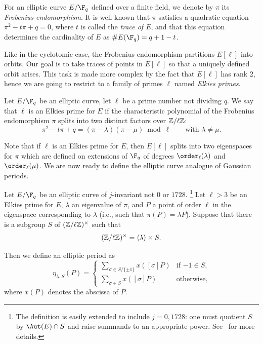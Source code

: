 For an elliptic curve $E/\F_q$ defined over a finite field, we denote
by $\pi$ its \emph{Frobenius endomorphism}. It is well known that
$\pi$ satisfies a quadratic equation $\pi^2-t\pi+q=0$, where $t$ is
called the \emph{trace of $E$}, and that this equation determines the
cardinality of $E$ as $\#E(\F_q)=q+1-t$.

Like in the cyclotomic case, the Frobenius endomorphism partitions
$E[\ell]$ into orbits. Our goal is to take traces of points in
$E[\ell]$ so that a uniquely defined orbit arises. This task is made
more complex by the fact that $E[\ell]$ has rank 2, hence we are going
to restrict to a family of primes $\ell$ named \emph{Elkies primes}.

\begin{definition}
  Let $E/\F_q$ be an elliptic curve, let $\ell$ be a prime number not
  dividing $q$.  We say that $\ell$ is an Elkies prime for $E$ if the
  characteristic polynomial of the Frobenius endomorphism $\pi$ splits
  into two distinct factors over $\mathbb{Z}/\ell\mathbb{Z}$:
\begin{equation}
\pi^2-t\pi+q=(\pi-\lambda)(\pi-\mu)\bmod\ell
\qquad\text{with $\lambda\ne\mu$}.
\end{equation}
\end{definition}

Note that if $\ell$ is an Elkies prime for $E$, then $E[\ell]$ splits
into two eigenspaces for $\pi$ which are defined on extensions of
$\F_q$ of degrees $\order_\ell(\lambda)$ and $\order_\ell(\mu)$. We
are now ready to define the elliptic curve analogue of Gaussian
periods.

\begin{definition}
  \label{definition:ellperiod}
  Let $E/\F_q$ be an elliptic curve of $j$-invariant not $0$ or
  $1728$.%
  \footnote{The definition is easily extended to include $j=0,1728$:
    one must quotient $S$ by $\Aut(E)\cap S$ and raise summands to an
    appropriate power. See~\cite{ffisom-long} for more details.} %
  Let $\ell > 3$ be an Elkies prime for $E$, $\lambda$ an eigenvalue
  of $\pi$, and $P$ a point of order $\ell$ in the eigenspace
  corresponding to $\lambda$ (i.e., such that $\pi(P)=\lambda P$).
  Suppose that there is a subgroup $S$ of $(\mathbb{Z}/\ell\mathbb{Z})^{\times}$ such
  that
  \begin{equation}
    (\mathbb{Z}/\ell\mathbb{Z})^{\times} = \langle{\lambda}\rangle \times S.
  \end{equation}
  
  Then we define an elliptic period as
  \begin{equation}
    \eta_{\lambda,S}(P) =
    \begin{cases}
      \sum_{\sigma\in S/\{\pm1\}} {x \left([\sigma] P \right)} & \text{if $-1\in S$,}\\
      \sum_{\sigma\in S} {x \left([\sigma] P \right)} & \text{otherwise,}
    \end{cases}
  \end{equation}
  where $x(P)$ denotes the abscissa of $P$.
\end{definition}

